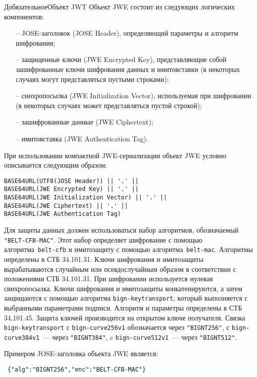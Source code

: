 \begin{appendix}{Д}{обязательное}{Объект JWT}
Объект JWE состоит из следующих логических компонентов:
\begin{itemize}
\item[--] 
JOSE-заголовок (JOSE Header), определяющий параметры и алгоритм шифрования;
\item[--] 
защищенные ключи (JWE Encrypted Key), представляющие собой 
зашифрованные ключи шифрования данных и имитовставки 
(в некоторых случаях могут представляться пустыми строками);
\item[--] 
синхропосылка (JWE Initialization Vector), используемая при шифровании 
(в некоторых случаях может представляться пустой строкой);
\item[--]
зашифрованные данные (JWE Ciphertext);
\item[--]
имитовставка (JWE Authentication Tag).
\end{itemize}

При использовании компактной JWE-сериализации объект JWE условно 
описывается следующим образом:
\begin{lstlisting}
BASE64URL(UTF8(JOSE Header)) || '.' ||
BASE64URL(JWE Encrypted Key) || '.' ||
BASE64URL(JWE Initialization Vector) || '.' ||
BASE64URL(JWE Ciphertext) || '.' ||
BASE64URL(JWE Authentication Tag)
\end{lstlisting}

Для защиты данных должен использоваться набор алгоритмов,
обозначаемый \lstinline{"BELT-CFB-MAC"}. Этот набор определяет шифрование
с помощью алгоритма~\lstinline{belt-cfb} и имитозащиту с помощью 
алгоритма~\lstinline{belt-mac}. Алгоритмы определены в СТБ 34.101.31. 
Ключи шифрования и имитозащиты вырабатываются случайным или 
псевдослучайным образом в соответствии с положениями СТБ 34.101.31.
При шифровании используется нулевая синхропосылка.
%
Ключи шифрования и имитозащиты конкатенируются, а затем защищаются 
с помощью алгоритма \lstinline{bign-keytransport},
который выполняется с выбранными параметрами подписи.  
Алгоритм и параметры определены в СТБ 34.101.45.
%
Защита ключей производится на открытом ключе получателя. 
%
Связка \lstinline{bign-keytransport} с \lstinline{bign-curve256v1}
обозначается через \lstinline{"BIGNT256"},
с \lstinline{bign-curve384v1}~--- через \lstinline{"BIGNT384"},
c \lstinline{bign-curve512v1}~--- через \lstinline{"BIGNT512"}.

Примером JOSE-заголовка объекта JWE является:
\begin{lstlisting}
 {"alg":"BIGNT256","enc":"BELT-CFB-MAC"}
\end{lstlisting}


\end{appendix}
